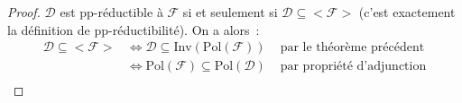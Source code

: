 \documentclass[12pt]{article}
\newcommand\Inv{\text{Inv}}
\newcommand\Pol{\text{Pol}}
\begin{document}
\begin{proof}
    $\mathcal{D}$ est pp-réductible à $\mathcal{F}$ si et seulement si
    $\mathcal{D}\subseteq<\mathcal{F}>$ (c'est exactement la définition de
    pp-réductibilité). On a alors~:
    \[\begin{array}{rll}
        \mathcal{D}\subseteq<\mathcal{F}>
          &\iff \mathcal{D}\subseteq\Inv(\Pol(\mathcal{F}))
            & \text{ par le théorème précédent} \\
          &\iff \Pol(\mathcal{F})\subseteq\Pol(\mathcal{D})
            & \text{ par propriété d'adjunction} \\
    \end{array}\]
\end{proof}
\end{document}
